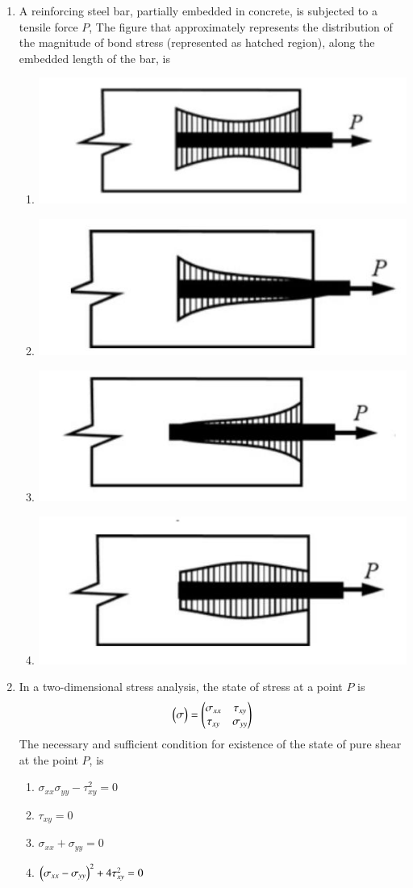 \documentclass[journal]{IEEEtran}
\begin{document}
\begin{enumerate}
\item A reinforcing steel bar, partially embedded in concrete, is subjected to a tensile force $P$, The figure that approximately represents the distribution of the magnitude of bond stress (represented as hatched region), along the embedded length of the bar, is
\begin{multicols}{2}
    \begin{enumerate}
        \item \includegraphics[width=0.5\linewidth]{figs/fig_a.png}
        \item \includegraphics[width=0.5\linewidth]{figs/fig_b.png}
        \item \includegraphics[width=0.5\linewidth]{figs/fig_c.png}
        \item \includegraphics[width=0.5\linewidth]{figs/fig_d.png}
    \end{enumerate}
\end{multicols}

\item In a two-dimensional stress analysis, the state of stress at a point $P$ is
\begin{align*}
    \begin{pmatrix}\sigma\end{pmatrix} = \begin{pmatrix}\sigma_{xx} & \tau_{xy} \\ \tau_{xy} & \sigma_{yy}\end{pmatrix}
\end{align*}
The necessary and sufficient condition for existence of the state of pure shear at the point $P$, is
\begin{multicols}{2}
    \begin{enumerate}
        \item $\sigma_{xx} \sigma_{yy} - \tau^2_{xy} = 0$
        \item $\tau_{xy} = 0$
        \item $\sigma_{xx} + \sigma_{yy} = 0$
        \item $\left(\sigma_{xx} - \sigma_{yy}\right)^2 + 4 \tau^2_{xy} = 0$
    \end{enumerate}
\end{multicols}


\end{enumerate}
\end{document}
